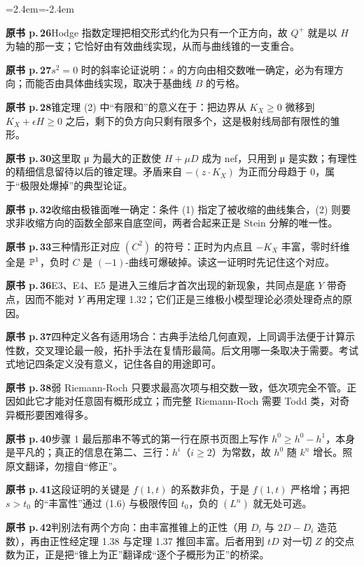\begin{list}{}{\leftmargin=2.4em\itemindent=-2.4em\itemsep=2pt\parsep=0pt}
\item \textbf{原书 p.\,26}\quad Hodge 指数定理把相交形式约化为只有一个正方向，故 $Q^+$ 就是以 $H$ 为轴的那一支；它恰好由有效曲线实现，从而与曲线锥的一支重合。
\item \textbf{原书 p.\,27}\quad $s^2=0$ 时的斜率论证说明：$s$ 的方向由相交数唯一确定，必为有理方向；而能否由具体曲线实现，取决于基曲线 $B$ 的亏格。
\item \textbf{原书 p.\,28}\quad 锥定理 (2) 中“有限和”的意义在于：把边界从 $K_X\ge0$ 微移到 $K_X+\epsilon H\ge0$ 之后，剩下的负方向只剩有限多个，这是极射线局部有限性的雏形。
\item \textbf{原书 p.\,30}\quad 这里取 μ 为最大的正数使 $H+\mu D$ 成为 nef，只用到 μ 是实数；有理性的精细信息留待以后的锥定理。矛盾来自 $-(z\cdot K_X)$ 为正而分母趋于 $0$，属于“极限处爆掉”的典型论证。
\item \textbf{原书 p.\,32}\quad 收缩由极锥面唯一确定：条件 (1) 指定了被收缩的曲线集合，(2) 则要求非收缩方向的函数全部来自底空间，两者合起来正是 Stein 分解的唯一性。
\item \textbf{原书 p.\,33}\quad 三种情形正对应 $(C^2)$ 的符号：正时为内点且 $-K_X$ 丰富，零时纤维全是 $\mathbb{P}^1$，负时 $C$ 是 $(-1)$-曲线可爆破掉。读这一证明时先记住这个对应。
\item \textbf{原书 p.\,36}\quad E3、E4、E5 是进入三维后才首次出现的新现象，共同点是底 $Y$ 带奇点，因而不能对 $Y$ 再用定理 1.32；它们正是三维极小模型理论必须处理奇点的原因。
\item \textbf{原书 p.\,37}\quad 四种定义各有适用场合：古典手法给几何直观，上同调手法便于计算示性数，交叉理论最一般，拓扑手法在复情形最简。后文用哪一条取决于需要。考试式地记四条定义没有意义，记住各自的用途即可。
\item \textbf{原书 p.\,38}\quad 弱 Riemann-Roch 只要求最高次项与相交数一致，低次项完全不管。正因如此它才能对任意固有概形成立；而完整 Riemann-Roch 需要 Todd 类，对奇异概形要困难得多。
\item \textbf{原书 p.\,40}\quad 步骤 1 最后那串不等式的第一行在原书页图上写作 $h^0\ge h^0-h^1$，本身是平凡的；真正的信息在第二、三行：$h^i$（$i\ge2$）为常数，故 $h^0$ 随 $k^n$ 增长。照原文翻译，勿擅自“修正”。
\item \textbf{原书 p.\,41}\quad 这段证明的关键是 $f(1,t)$ 的系数非负，于是 $f(1,t)$ 严格增；再把 $s>t_0$ 的“丰富性”通过 (1.6) 与极限传回 $t_0$，负的 $(L^n)$ 就无处可逃。
\item \textbf{原书 p.\,42}\quad 判别法有两个方向：由丰富推锥上的正性（用 $D_i$ 与 $2D-D_i$ 造范数），再由正性经定理 1.38 与定理 1.37 推回丰富。后者用到 $tD$ 对一切 $Z$ 的交点数为正，正是把“锥上为正”翻译成“逐个子概形为正”的桥梁。

\end{list}

